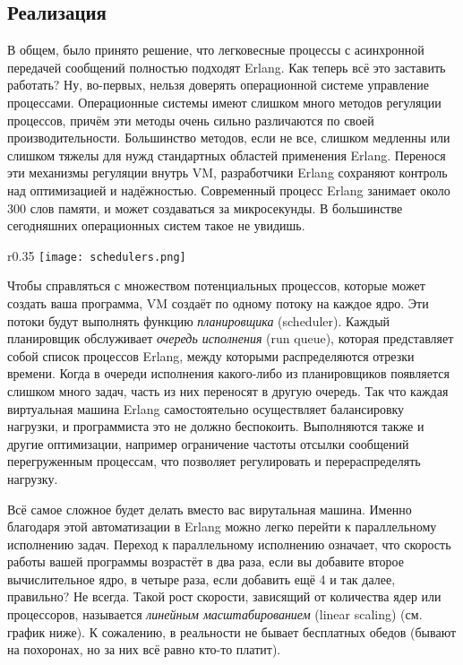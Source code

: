\subsection{Реализация}
\label{implementation}
В общем, было принято решение, что легковесные процессы с асинхронной передачей сообщений полностью подходят Erlang.
Как теперь всё это заставить работать?
Ну, во\--первых, нельзя доверять операционной системе управление процессами.
Операционные системы имеют слишком много методов регуляции процессов, причём эти методы очень сильно различаются по своей производительности.
Большинство методов, если не все, слишком медленны или слишком тяжелы для нужд стандартных областей применения Erlang.
Перенося эти механизмы регуляции внутрь VM, разработчики Erlang сохраняют контроль над оптимизацией и надёжностью.
Современный процесс Erlang занимает около 300 слов памяти, и может создаваться за микросекунды.
В большинстве сегодняшних операционных систем такое не увидишь.

\begin{wrapfigure}{r}{0.35\linewidth}
    \texttt{[image: schedulers.png]}
\end{wrapfigure}
Чтобы справляться с множеством потенциальных процессов, которые может создать ваша программа, VM создаёт по одному потоку на каждое ядро.
Эти потоки будут выполнять функцию \emph{планировщика} (scheduler).
Каждый планировщик обслуживает \emph{очередь исполнения} (run queue), которая представляет собой список процессов Erlang, между которыми распределяются отрезки времени.
Когда в очереди исполнения какого\--либо из планировщиков появляется слишком много задач, часть из них переносят в другую очередь.
Так что каждая виртуальная машина Erlang самостоятельно осуществляет балансировку нагрузки, и программиста это не должно беспокоить.
Выполняются также и другие оптимизации, например ограничение частоты отсылки сообщений перегруженным процессам, что позволяет регулировать и перераспределять нагрузку.

Всё самое сложное будет делать вместо вас вирутальная машина.
Именно благодаря этой автоматизации в Erlang можно легко перейти к параллельному исполнению задач.
Переход к параллельному исполнению означает, что скорость работы вашей программы возрастёт в два раза, если вы добавите второе вычислительное ядро, в четыре раза, если добавить ещё 4 и так далее, правильно?
Не всегда.
Такой рост скорости, зависящий от количества ядер или процессоров, называется \emph{линейным масштабированием} (linear scaling) (см. график ниже).
К сожалению, в реальности не бывает бесплатных обедов (бывают на похоронах, но за них всё равно кто\--то платит).
